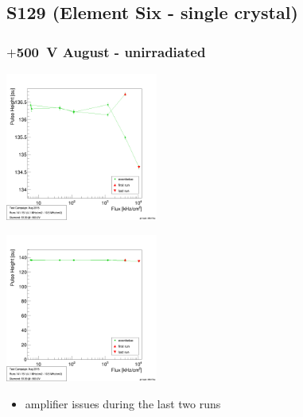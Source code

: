 \documentclass[9pt]{beamer}
\begin{document}
\subsection{S129 (Element Six - single crystal)}
\begin{frame}
	\frametitle{$+$\SI{500}{V} August - unirradiated}
	\begin{minipage}{5.5cm}
		\centering
		\includegraphics[width=5cm]{PHS41}
	\end{minipage}
	\hspace*{2pt}
	\begin{minipage}{5.5cm}
		\centering
		\includegraphics[width=5cm]{PHSZ41}
	\end{minipage}\s
	\begin{itemize}
		\item amplifier issues during the last two runs
	\end{itemize}
\end{frame}
\end{document}
